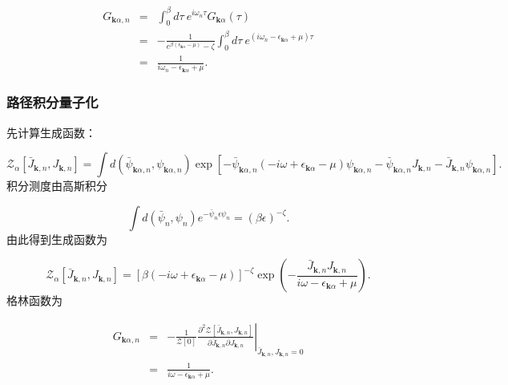 \documentclass[UTF8]{ctexart}
\begin{document}
\begin{eqnarray}
G_{\bm{k}\alpha,n} & = & \int_{0}^{\beta}d\tau\ e^{i\omega_{n}\tau}G_{\bm{k}\alpha}\left(\tau\right)\nonumber \\
 & = & -\frac{1}{e^{\beta\left(\epsilon_{\bm{k}\alpha}-\mu\right)}-\zeta}\int_{0}^{\beta}d\tau\ e^{\left(i\omega_{n}-\epsilon_{\bm{k}\alpha}+\mu\right)\tau}\nonumber \\
 & = & \frac{1}{i\omega_{n}-\epsilon_{\bm{k}\alpha}+\mu}.
\end{eqnarray}


\subsubsection{路径积分量子化}

先计算生成函数：

\begin{equation}
\mathcal{Z}_{\alpha}\left[\bar{J}_{\bm{k},n},J_{\bm{k},n}\right]=\int d\left(\bar{\psi}_{\bm{k}\alpha,n},\psi_{\bm{k}\alpha,n}\right)\exp\left[-\bar{\psi}_{\bm{k}\alpha,n}\left(-i\omega+\epsilon_{\bm{k}\alpha}-\mu\right)\psi_{\bm{k}\alpha,n}-\bar{\psi}_{\bm{k}\alpha,n}J_{\bm{k},n}-\bar{J}_{\bm{k},n}\psi_{\bm{k}\alpha,n}\right].
\end{equation}
积分测度由高斯积分

\begin{equation}
\int d\left(\bar{\psi}_{n},\psi_{n}\right)e^{-\bar{\psi}_{n}\epsilon\psi_{n}}=\left(\beta\epsilon\right)^{-\zeta}.
\end{equation}
由此得到生成函数为

\begin{equation}
\mathcal{Z}_{\alpha}\left[\bar{J}_{\bm{k},n},J_{\bm{k},n}\right]=\left[\beta\left(-i\omega+\epsilon_{\bm{k}\alpha}-\mu\right)\right]^{-\zeta}\exp\left(-\frac{\bar{J}_{\bm{k},n}J_{\bm{k},n}}{i\omega-\epsilon_{\bm{k}\alpha}+\mu}\right).
\end{equation}
格林函数为

\begin{eqnarray}
G_{\bm{k}\alpha,n} & = & -\frac{1}{\mathcal{Z}\left[0\right]}\left.\frac{\partial^{2}\mathcal{Z}\left[\bar{J}_{\bm{k},n},J_{\bm{k},n}\right]}{\partial\bar{J}_{\bm{k},n}\partial J_{\bm{k},n}}\right|_{\bar{J}_{\bm{k},n},J_{\bm{k},n}=0}\nonumber \\
 & = & \frac{1}{i\omega-\epsilon_{\bm{k}\alpha}+\mu}.
\end{eqnarray}
\end{document}
